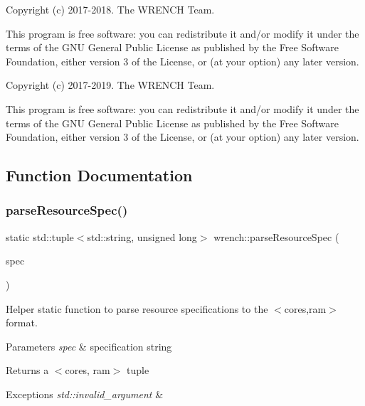Copyright (c) 2017-\/2018. The W\+R\+E\+N\+CH Team.

This program is free software\+: you can redistribute it and/or modify it under the terms of the G\+NU General Public License as published by the Free Software Foundation, either version 3 of the License, or (at your option) any later version.

Copyright (c) 2017-\/2019. The W\+R\+E\+N\+CH Team.

This program is free software\+: you can redistribute it and/or modify it under the terms of the G\+NU General Public License as published by the Free Software Foundation, either version 3 of the License, or (at your option) any later version. 

\subsection{Function Documentation}
\mbox{\label{namespacewrench_a9601a7728120192951232d2e0a74a483}} 
\subsubsection{\texorpdfstring{parse\+Resource\+Spec()}{parseResourceSpec()}}
{\footnotesize\ttfamily static std\+::tuple$<$std\+::string, unsigned long$>$ wrench\+::parse\+Resource\+Spec (\begin{DoxyParamCaption}\item[{std\+::string}]{spec }\end{DoxyParamCaption})\hspace{0.3cm}{\ttfamily [static]}}



Helper static function to parse resource specifications to the $<$cores,ram$>$ format. 


\begin{DoxyParams}{Parameters}
{\em spec} & specification string \\
\hline
\end{DoxyParams}
\begin{DoxyReturn}{Returns}
a $<$cores, ram$>$ tuple 
\end{DoxyReturn}

\begin{DoxyExceptions}{Exceptions}
{\em std\+::invalid\+\_\+argument} & \\
\hline
\end{DoxyExceptions}
